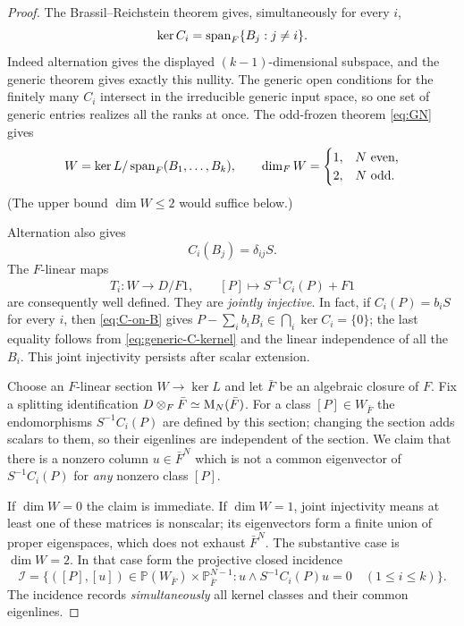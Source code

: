 \begin{proof}
The Brassil--Reichstein theorem gives, simultaneously for
every $i$,
\begin{equation}\label{eq:generic-C-kernel}
 \ker C_i=\operatorname{span}_F\{B_j:j\ne i\}.
\end{equation}
Indeed alternation gives the displayed $(k-1)$-dimensional
subspace, and the generic theorem gives exactly this nullity.
The generic open conditions for the finitely many $C_i$
intersect in the irreducible generic input space, so one set
of generic entries realizes all the ranks at once.
The odd-frozen theorem \eqref{eq:GN} gives
\begin{equation}\label{eq:generic-W}
 W=\ker L/\operatorname{span}_F(B_1,\ldots,B_k),\qquad
 \dim_F W=\begin{cases}1,&N\text{ even},\\2,&N\text{ odd}.
 \end{cases}
\end{equation}
(The upper bound $\dim W\le2$ would suffice below.)

Alternation also gives
\begin{equation}\label{eq:C-on-B}
 C_i(B_j)=\delta_{ij}S.
\end{equation}
The $F$-linear maps
\begin{equation}\label{eq:generic-T}
 T_i:W\longrightarrow D/F1,
 \qquad[P]\longmapsto S^{-1}C_i(P)+F1
\end{equation}
are consequently well defined. They are \emph{jointly
injective}. In fact, if $C_i(P)=b_iS$ for every $i$, then
\eqref{eq:C-on-B} gives
$P-\sum_i b_iB_i\in\bigcap_i\ker C_i=\{0\}$;
the last equality follows from \eqref{eq:generic-C-kernel}
and the linear independence of all the $B_i$.
This joint injectivity persists after scalar extension.

Choose an $F$-linear section $W\to\ker L$ and let
$\bar F$ be an algebraic closure of $F$. Fix a splitting
identification $D\otimes_F\bar F\simeq\mathrm{M}_N(\bar F)$.
For a class $[P]\in W_{\bar F}$ the endomorphisms
$S^{-1}C_i(P)$ are defined by this section; changing the
section adds scalars to them, so their eigenlines are
independent of the section. We claim that there is a nonzero
column $u\in\bar F^N$ which is not a common eigenvector of
$S^{-1}C_i(P)$ for \emph{any} nonzero class $[P]$.

If $\dim W=0$ the claim is immediate. If $\dim W=1$, joint
injectivity means at least one of these matrices is nonscalar;
its eigenvectors form a finite union of proper eigenspaces,
which does not exhaust $\bar F^N$. The substantive case is
$\dim W=2$. In that case form the projective closed incidence
\begin{equation}\label{eq:generic-incidence}
 \mathcal I=\bigl\{([P],[u])\in
 \mathbb P(W_{\bar F})\times\mathbb P^{N-1}_{\bar F}:
 u\wedge S^{-1}C_i(P)u=0\quad(1\le i\le k)\bigr\}.
\end{equation}
The incidence records \emph{simultaneously} all kernel classes
and their common eigenlines.


\end{proof}
